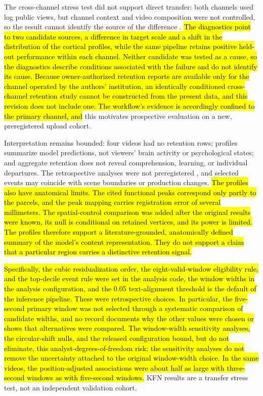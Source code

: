 \documentclass{ieeeaccess}
\newcommand{\rev}[1]{\hl{#1}}
\newcommand{\rev}[1]{#1}
\begin{document}
The cross-channel stress test did not support direct transfer: both channels used log public views, but channel context and video composition were not controlled, so the result cannot identify the source of the difference \cite{recht2019imagenet}. \rev{The diagnostics point to two candidate sources, a difference in target scale and a shift in the distribution of the cortical profiles, while the same pipeline retains positive held-out performance within each channel. Neither candidate was tested as a cause, so the diagnostics describe conditions associated with the failure and do not identify its cause. Because owner-authorized retention reports are available only for the channel operated by the authors' institution, an identically conditioned cross-channel retention study cannot be constructed from the present data, and this revision does not include one. The workflow's evidence is accordingly confined to the primary channel, and} this motivates prospective evaluation on a new, preregistered upload cohort.

Interpretation remains bounded: four videos had no retention rows; profiles summarize model predictions, not viewers' brain activity or psychological states; and aggregate retention does not reveal comprehension, learning, or individual departures. The retrospective analyses were not preregistered \cite{nosek2018preregistration}, and selected events may coincide with scene boundaries or production changes. \rev{The profiles also have anatomical limits. The cited functional peaks correspond only partly to the parcels, and the peak mapping carries registration error of several millimeters. The spatial-control comparison was added after the original results were known, its null is conditional on retained vertices, and its power is limited. The profiles therefore support a literature-grounded, anatomically defined summary of the model's content representation. They do not support a claim that a particular region carries a distinctive retention signal.}

\rev{Specifically, the cubic residualization order, the eight-valid-window eligibility rule, and the top-decile event rule were set in the analysis code, the window widths in the analysis configuration, and the 0.05 text-alignment threshold is the default of the inference pipeline. These were retrospective choices. In particular, the five-second primary window was not selected through a systematic comparison of candidate widths, and no record documents why the other values were chosen or shows that alternatives were compared. The window-width sensitivity analyses, the circular-shift nulls, and the released configuration bound, but do not eliminate, this analyst-degrees-of-freedom risk; the sensitivity analyses do not remove the uncertainty attached to the original window-width choice. In the same videos, the position-adjusted associations were about half as large with three-second windows as with five-second windows.} KFN results are a transfer stress test, not an independent validation cohort.
\end{document}
